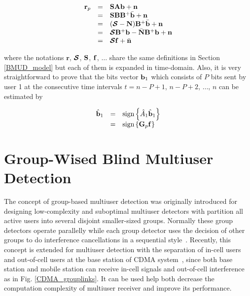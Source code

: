 \documentclass[a4paper,11pt,fleqn]{article}
\newcommand{\br}{{\mathbf r}}
\newcommand{\bA}{{\mathbf A}}
\newcommand{\bb}{{\bf b}}
\newcommand{\bG}{{\bf G}}
\newcommand{\bn}{{\bf n}}
\newcommand{\bbf}{{\bf f}}
\newcommand{\bN}{{\bf N}}
\newcommand{\bS}{{\bf S}}
\newcommand{\bB}{{\bf B}}
\newcommand{\bcS}{{\mbox {\boldmath ${\cal S}$}}}
\begin{document}
\begin{equation}
\begin{array}{rcl}
\br_p&=&\bS\bA\bb + \bn\\
 &=&\bS\bB\bB^{+}\bar\bb + \bn\\
 &=&(\bcS-{\bN})\bB^{+}\bar\bb + \bn\\
 &=&\bcS\bB^{+}\bb-\bar{\bN}\bB^{+}\bb + \bn\\
 &=&\bcS\bbf + \bar{\bn} \label{rn}
\end{array}
\end{equation}

\noindent where the notations $\br$, $\bcS$, $\bS$, $\bbf$,
$\ldots$ share the same definitions in Section \ref{BMUD_model}
but each of them is expanded in time-domain. Also, it is very
straightforward to prove that the bits vector $\bb_1$ which
consists of $P$ bits sent by user 1 at the consecutive time
intervals $t=n-P+1$, $n-P+2$, $\ldots$, $n$ can be estimated by

\begin{equation}
\begin{array}{rcl}
\hat{\bb}_1&=&\mbox{sign}\left\{\hat{A}_1\hat{\bb}_1\right\}\\
&=&\mbox{sign}\left\{\bG_p\bbf\right\}
\end{array}\label{bb_estimate}
\end{equation}


\pagebreak




\section{Group-Wised Blind Multiuser Detection\label{GroupMUD}}
The concept of group-based multiuser detection was originally
introduced for designing low-complexity and suboptimal multiuser
detectors with partition all active users into several disjoint
smaller-sized groups. Normally these group detectors operate
parallelly while each group detector uses the decision of other
groups to do interference cancellations in a sequential
style~\cite{Mahesh95}. Recently, this concept is extended for
multiuser detection with the separation of in-cell users and
out-of-cell users at the base station of CDMA
system~\cite{Wang99A}, since both base station and mobile station
can receive in-cell signals and out-of-cell interference as in
Fig. \ref{CDMA_grouplinks}. It can be used help both decrease the
computation complexity of multiuser receiver and improve its
performance.
\end{document}
